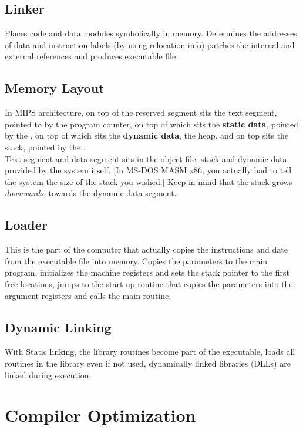 \documentclass[11pt,a4paper,twocolumn]{book}
\begin{document}
\subsection{Linker}

Places code and data modules symbolically in memory. Determines the addresses of data and instruction labels (by using relocation info) patches the internal and external references and produces executable file.

\subsection{Memory Layout}

In MIPS architecture, on top of the reserved segment sits the text segment, pointed to by the program counter, on top of which sits the \textbf{static data}, pointed by the , on top of which sits the \textbf{dynamic data}, the heap. and on top sits the stack, pointed by the .\\

Text segment and data segment sits in the object file, stack and dynamic data provided by the system itself. [In MS-DOS MASM x86, you actually had to tell the system the size of the stack you  wished.] Keep in mind that the stack grows \textit{downwards}, towards the dynamic data segment.

\subsection{Loader}

This is the part of the computer that actually copies the instructions and date from the executable file into memory. Copies the parameters to the main program, initializes the machine registers and sets the stack pointer to the first free locations, jumps to the start up routine that copies the parameters into the argument registers and calls the main routine.

\subsection{Dynamic Linking}

With Static linking, the library routines become part of the executable, loads all routines in the library even if not used, dynamically linked libraries (DLLs) are linked during execution.

\section{Compiler Optimization}
\end{document}

